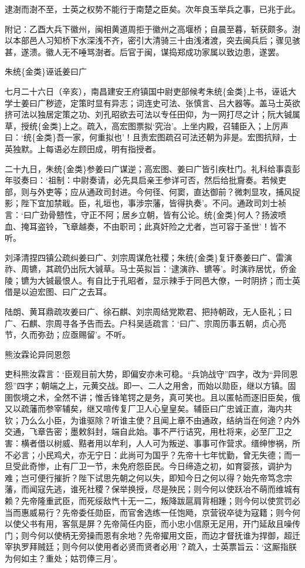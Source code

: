 \documentclass[]{article}
\begin{document}
逮澍而澍不至，士英之权势不能行于南楚之臣矣。次年良玉举兵之事，已兆于此。

附记：乙酉大兵下徽州，闽相黄道周拒于徽州之高堰桥；自晨至暮，斩获颇多。澍以本部邑人习知桥下水深浅不齐，密引大清骑三十由浅渚渡，突去闽兵后；骤见骇甚，遂溃。徽人无不唾骂澍者。后官于闽，谋捣郑成功家属以致边患，遂罢。

朱统\{金类\}诬诋姜曰广

七月二十六日（辛亥），南昌建安王府镇国中尉吏部候考朱统\{金类\}上书，诬诋大学士姜曰广秽迹，定策时显有异志；词连史可法、张慎言、吕大器等。盖马士英欲挤可法以独居定策之功、刘孔昭欲去可法以专任田仰，为一网打尽之计；阮大铖属草，授统\{金类\}上之。疏入，高宏图票拟`究治'。上坐内殿，召辅臣入；上厉声曰：`统\{金类\}吾一家，何重拟也'！且责宏图疏召可法还朝为非是。宏图抗辩，士英独默。上每语必左顾田成，明有指授者。

二十九日，朱统\{金类\}参姜曰广谋逆；高宏图、姜曰广皆引疾杜门。礼科给事袁彭年驳奏曰：`祖制：中尉奏请，必先具启亲王参详可否，然后给批齎奏。若候吏部，则与外吏等；应从通政司封进。今何径、何窦，直达御前？微刺显攻，捕风捉影；陛下宜加禁戢。臣，礼垣也，事涉宗藩，皆得执奏'。不问。通政司刘士祯言：`曰广劲骨戆性，守正不阿；居乡立朝，皆有公论。统\{金类\}何人？扬波喷血、掩耳盗铃，飞章越奏，不由职司；此真奸险之尤者，岂可容于圣世'！皆不听。

刘泽清捏四镇公疏纠姜曰广、刘宗周谋危社稷；朱统\{金类\}复讦奏姜曰广、雷演祚、周镳，其疏仍出阮大铖草。马士英拟旨：`逮演祚、镳等'。时演祚居忧，侨金陵；镳为大铖最恨人。有自比于孔昭者，显示辣手于同邑大僚，一时阴挤；而士英借是以迫宏图、曰广之去耳。

陆朗、黄耳鼎疏攻姜曰广、徐石麒、刘宗周结党欺君、把持朝政，无人臣礼；曰广、石麒、宗周寻各予告而去。户科吴适疏言：`曰广、宗周历事五朝，贞心亮节，久而弥劲；应亟赐留'。不听。

熊汝霖论异同恩怨

吏科熊汝霖言：`臣观目前大势，即偏安亦未可稳。``兵饷战守''四字，改为``异同恩怨''四字；朝端之上，元黄交战。即一、二人之用舍，而始以勋臣，继以方镇。固圉恢境之术，全然不讲；惟舌锋笔锷之是务，真可笑也。且以匿帖而逐旧臣矣，俄又以疏藩而参宰辅矣，继又喧传复厂卫人心皇皇矣。辅臣曰广忠诚正直，海内共钦；乃么么小臣，为谁驱除？听谁主使？且闻上章不由通政，结纳当在何途？内外交通，飞章告密；墨敕斜封，端自此始。事不严行诘究，用杜将来，必至厂卫之害：横者借以树威、黠者用以牟利，人人可为叛逆、事事可作营求。缙绅惨祸，所不必言；小民鸡犬，亦无宁日：此尚可为国乎？先帝十七年忧勤，曾无失德；而一旦受此奇惨，止有厂卫一节，未免府怨臣民。今日缔造之初，如育婴孩，调护为难；岂可便行摧折？陛下试思先朝之何以失，即知今日之何以得？始先帝笃念宗藩，而闻寇先逃，谁死社稷？保举换授，尽是殃民；则今何以使跃冶不萌而维城有赖？先帝隆重武臣，而死绥敌忾十无一二，叛降跋扈肩背相踵；则今何以使赏罚必当而惠威易行？先帝委任勋臣，而官舍选练一任饱飏，京营锐卒徒为寇籍；则今何以使父书有用，客氛是屏？先帝简任内臣，而小忠小信原无足用，开门延敌且噪传门；则今何以使柄无旁操而恩有余地？先帝擢用文臣，而边才督抚谁为捍御，超迁宰执罗拜贼廷；则今何以使用者必贤而贤者必用'？疏入，士英票旨云：`这厮指朕为何如主？重处；姑罚俸三月'。
\end{document}
